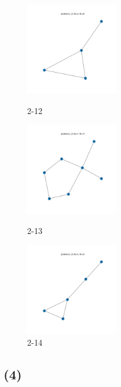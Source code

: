 \documentclass[a4paper, 10pt, dvipdfmx]{jlreq}
\begin{document}
\begin{figure}[htbp]
  \begin{minipage}{0.33\hsize}
    \begin{center}
      \includegraphics[width=40mm]{img_5/problem2_12.png}
    \end{center}
    \caption{2-12}
  \end{minipage}
  \begin{minipage}{0.33\hsize}
    \begin{center}
      \includegraphics[width=40mm]{img_5/problem2_13.png}
    \end{center}
    \caption{2-13}
  \end{minipage}
  \begin{minipage}{0.33\hsize}
    \begin{center}
      \includegraphics[width=40mm]{img_5/problem2_14.png}
    \end{center}
    \caption{2-14}
  \end{minipage}
\end{figure}

\subsection*{(4)}
\end{document}
